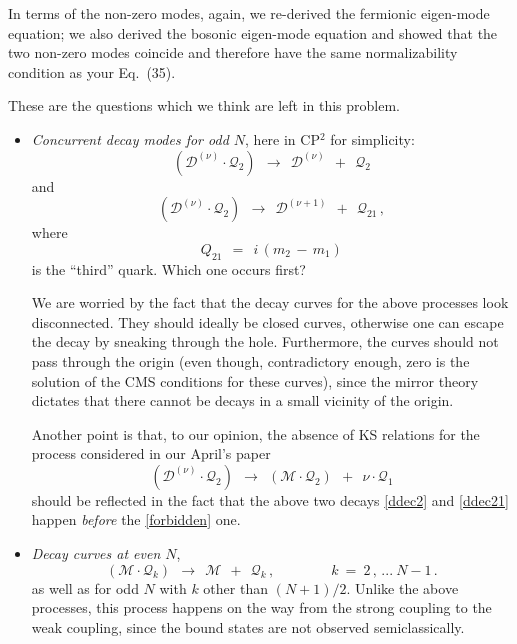 \documentclass[epsfig,12pt]{article}
\def\beq{\begin{equation}}
\def\eeq{\end{equation}}
\def\beq{\begin{equation}}
\def\eeq{\end{equation}}
\newcommand{\mc}[1]{\mathcal{#1}}
\begin{document}
	In terms of the non-zero modes, again, we re-derived the fermionic eigen-mode equation; we also derived 
	the bosonic eigen-mode equation and showed that the two non-zero modes coincide and therefore have the
	same normalizability condition as your Eq.~(35).


\pagebreak
	These are the questions which we think are left in this problem.

\begin{itemize}

\item
	{\it Concurrent decay modes for odd $ N $}, here in CP$^2$ for simplicity:
\beq
\label{ddec2}
	( \mc{D}^{(\nu)} \!\cdot\! \mc{Q}_2 )  ~~\longrightarrow~~    \mc{D}^{(\nu)}  ~~+~~ \mc{Q}_2
\eeq
	and
\beq
\label{ddec21}
	( \mc{D}^{(\nu)} \!\cdot\! \mc{Q}_2 )  ~~\longrightarrow~~    \mc{D}^{(\nu+1)}  ~~+~~ \mc{Q}_{21}\,,
\eeq
	where
\beq
	Q_{21} ~~=~~ i \,( m_2 \,-\, m_1 )	
\eeq
	is the ``third'' quark.
	Which one occurs first?


	We are worried by the fact that the decay curves for the above processes look disconnected. 
	They should ideally be closed curves, otherwise one can escape the decay by sneaking through the hole.
	Furthermore, the curves should not pass through the origin (even though, contradictory enough,
	zero is the solution of the CMS conditions for these curves), since the mirror theory dictates 
	that there cannot be decays in a small vicinity of the origin.

	Another point is that, to our opinion, the absence of KS relations for the process considered in our April's paper
\beq
\label{forbidden}
	( \mc{D}^{(\nu)} \!\cdot\! \mc{Q}_2 )   ~~\longrightarrow~~   ( \mc{M} \!\cdot\! \mc{Q}_2 )  ~~+~~ \nu \cdot \mc{Q}_1
\eeq
	should be reflected in the fact that the above two decays \eqref{ddec2} and \eqref{ddec21} happen
	{\it before} the \eqref{forbidden} one.


\item
	{\it Decay curves at even $ N $}, 
\beq
	( \mc{ M } \!\cdot\! \mc{Q}_k )   ~~\longrightarrow~~   \mc{M} ~~+~~ \mc{Q}_k\,,\qquad\qquad k ~=~ 2\,,\,...~ N-1\,.
\eeq
	as well as for odd $ N $ with $ k $ other than $ (N + 1)/2 $.
	Unlike the above processes, this process happens on the way from the strong coupling to the weak coupling,
	since the bound states are not observed semiclassically.


\end{itemize}
\end{document}
